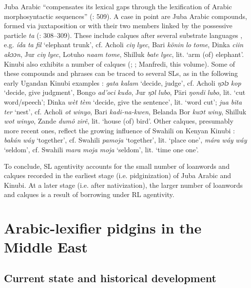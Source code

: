 \documentclass[output=paper]{langsci/langscibook}
\begin{document}
Juba Arabic “compensates its lexical gaps through the lexification of Arabic morphosyntactic sequences”  (\citealt{ToscoManfredi2013}: 509). A case in point are Juba Arabic compounds, formed via juxtaposition or with their two members linked by the possessive particle \textit{ta} (\citealt{Manfredi2014relex}: 308–309). These include calques after several substrate languages \citep[136]{Nakao2012}, e.g. \textit{ída} \textit{ta} \textit{fil} ‘elephant trunk’, cf. Acholi \textit{ciŋ} \textit{lyec}, Bari \textit{könin} \textit{lo} \textit{tome}, Dinka \textit{ciin} \textit{akɔɔn}, Jur \textit{ciŋ} \textit{lyec}, Lotuho \textit{naam} \textit{tome}, Shilluk \textit{bate} \textit{lyec}, lit. ‘arm (of) elephant’. Kinubi also exhibits a number of calques (\citealt{Nakao2012}; \citealt{Avram2017talk}; Manfredi, this volume). Some of these compounds and phrases can be traced to several SLs, as in the following early Ugandan Kinubi examples \citep{Avram2017talk}: \textit{gata} \textit{kalam} ‘decide, judge’, cf. Acholi \textit{ŋɔlɔ} \textit{kop} ‘decide, give judgment’, Bongo \textit{ad'oci} \textit{kudo}, Jur \textit{ŋɔl} \textit{lubo}, Päri \textit{ŋondi} \textit{lubo}, lit. ‘cut word/speech’; Dinka \textit{wèt} \textit{tèm} ‘decide, give the sentence’, lit. ‘word cut’; \textit{jua} \textit{bita} \textit{ter} ‘nest’, cf. Acholi \textit{ot} \textit{winyo}, Bari \textit{kadi-na-kwen}, Belanda Bor \textit{kwɔt} \textit{winy}, Shilluk \textit{wot} \textit{winyo}, Zande \textit{dumô} \textit{zirê}, lit. ‘house (of) bird’. Other calques, presumably more recent ones, reflect the growing influence of Swahili on Kenyan Kinubi \citep[315]{Luffin2014}: \textit{bakán} \textit{wá}\textit{y} ‘together’, cf. Swahili \textit{pamoja} ‘together’, lit. ‘place one’, \textit{mára} \textit{wá}\textit{y} \textit{wáy} ‘seldom’, cf. Swahili \textit{mara} \textit{moja} \textit{moja} ‘seldom’, lit. ‘time one one’.

To conclude, SL agentivity accounts for the small number of loanwords and calques recorded in the earliest stage (i.e. pidginization) of Juba Arabic and Kinubi. At a later stage (i.e. after nativization), the larger number of loanwords and calques is a result of borrowing under RL agentivity.


 \section{Arabic-lexifier pidgins in the Middle East}\label{sec:pid}


 \subsection{Current state and historical development}
\end{document}
